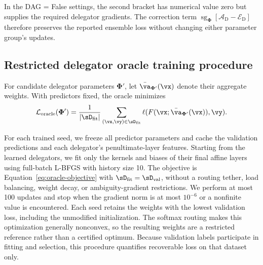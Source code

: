 \documentclass[10pt]{article} %
\def\vPhi{{\bm{\Phi}}}
\newcommand{\dambiguity}{\mathcal{A}_{\mathrm{D}}}
\newcommand{\dperformance}{\mathcal{E}_{\mathrm{D}}}
\newcommand{\sg}{\operatorname{sg}}
\begin{document}
In the DAG = False settings, the second bracket has numerical value zero but supplies the required delegator gradients. The correction term $\sg_{\vPhi}[\dambiguity-\dperformance]$ therefore preserves the reported ensemble loss without changing either parameter group's updates.

\subsection{Restricted delegator oracle training procedure} \label{ap:restricted-oracle}

For candidate delegator parameters $\vPhi'$, let $\bar{\va}_{\vPhi'}(\vx)$ denote their aggregate weights. With predictors fixed, the oracle minimizes
\begin{equation}\label{eq:oracle-objective}
    \mathcal{L}_{\mathrm{oracle}}(\vPhi')
    = \frac{1}{|\sD_{\mathrm{fit}}|}
      \sum_{(\vx,\vy)\in\sD_{\mathrm{fit}}}
      \ell(F(\vx;\bar{\va}_{\vPhi'}(\vx)),\vy).
\end{equation}

For each trained seed, we freeze all predictor parameters and cache the validation predictions and each delegator's penultimate-layer features. Starting from the learned delegators, we fit only the kernels and biases of their final affine layers using full-batch L-BFGS with history size 10. The objective is Equation~\ref{eq:oracle-objective} with $\sD_{\mathrm{fit}}=\sD_{\mathrm{val}}$, without a routing tether, load balancing, weight decay, or ambiguity-gradient restrictions. We perform at most 100 updates and stop when the gradient norm is at most $10^{-6}$ or a nonfinite value is encountered. Each seed retains the weights with the lowest validation loss, including the unmodified initialization. The softmax routing makes this optimization generally nonconvex, so the resulting weights are a restricted reference rather than a certified optimum. Because validation labels participate in fitting and selection, this procedure quantifies recoverable loss on that dataset only.
\end{document}
